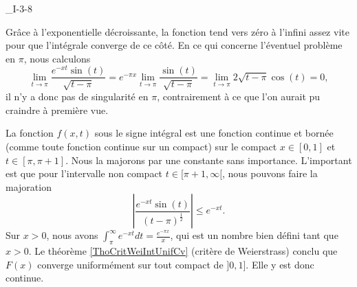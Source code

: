 

\begin{corrige}{_I-3-8}

Grâce à l'exponentielle décroissante, la fonction tend vers zéro à l'infini assez vite pour que l'intégrale converge de ce côté. En ce qui concerne l'éventuel problème en $\pi$, nous calculons
\begin{equation}
	\lim_{t\to\pi}\frac{  e^{-xt}\sin(t) }{ \sqrt{t-\pi} }= e^{-\pi x}\lim_{t\to\pi}\frac{\sin(t) }{ \sqrt{t-\pi} }=\lim_{t\to\pi}2\sqrt{t-\pi}\cos(t)=0,
\end{equation}
il n'y a donc pas de singularité en $\pi$, contrairement à ce que l'on aurait pu craindre à première vue. 

La fonction  $f(x,t)$ sous le signe intégral est une fonction continue et bornée (comme toute fonction continue sur un compact) sur le compact $x\in[0,1]$ et $t\in[\pi,\pi+1]$. Nous la majorons par une constante sans importance. L'important est que pour l'intervalle non compact $t\in[\pi+1,\infty[$, nous pouvons faire la majoration 
\begin{equation}
	\left| \frac{  e^{-xt}\sin(t) }{ (t-\pi)^{\frac{1}{ 2 }} } \right| \leq e^{-xt}.
\end{equation}
Sur $x>0$, nous avons $\int_{\pi}^{\infty} e^{-xt}dt=\frac{  e^{-\pi x} }{ x }$, qui est un nombre bien défini tant que $x>0$. Le théorème \ref{ThoCritWeiIntUnifCv} (critère de Weierstrass) conclu que $F(x)$ converge uniformément sur tout compact de $]0,1]$. Elle y est donc continue.

\end{corrige}
